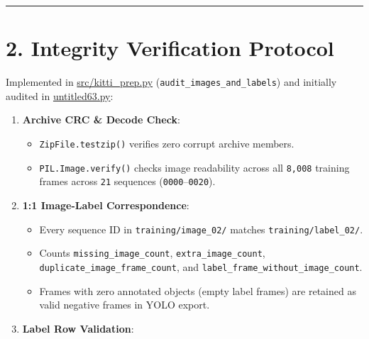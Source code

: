 \documentclass[10.5pt,a4paper]{article}
\begin{document}
\par\noindent\rule{\textwidth}{0.4pt}\par\medskip

\section{2. Integrity Verification Protocol}

Implemented in \href{https://github.com/Heisnotanimposter/Totalcare\_autonomous\_driving\_Yolov5/blob/main/src/kitti\_prep.py}{src/kitti\_prep.py} (\texttt{audit\_\allowbreak{}images\_\allowbreak{}and\_\allowbreak{}labels}) and initially audited in \href{https://github.com/Heisnotanimposter/Totalcare\_autonomous\_driving\_Yolov5/blob/main/untitled63.py}{untitled63.py}:


\begin{enumerate}[leftmargin=1.8em,itemsep=2pt]
\item \textbf{Archive CRC \& Decode Check}:
\begin{itemize}[leftmargin=1.5em,itemsep=2pt]
\item \texttt{ZipFile.\allowbreak{}testzip()} verifies zero corrupt archive members.
\item \texttt{PIL.\allowbreak{}Image.\allowbreak{}verify()} checks image readability across all \texttt{8,\allowbreak{}008} training frames across \texttt{21} sequences (\texttt{0000}--\texttt{0020}).
\end{itemize}
\item \textbf{1:1 Image-Label Correspondence}:
\begin{itemize}[leftmargin=1.5em,itemsep=2pt]
\item Every sequence ID in \texttt{training/\allowbreak{}image\_\allowbreak{}02/\allowbreak{}} matches \texttt{training/\allowbreak{}label\_\allowbreak{}02/\allowbreak{}}.
\item Counts \texttt{missing\_\allowbreak{}image\_\allowbreak{}count}, \texttt{extra\_\allowbreak{}image\_\allowbreak{}count}, \texttt{duplicate\_\allowbreak{}image\_\allowbreak{}frame\_\allowbreak{}count}, and \texttt{label\_\allowbreak{}frame\_\allowbreak{}without\_\allowbreak{}image\_\allowbreak{}count}.
\item Frames with zero annotated objects (empty label frames) are retained as valid negative frames in YOLO export.
\end{itemize}
\item \textbf{Label Row Validation}:
\begin{itemize}[leftmargin=1.5em,itemsep=2pt]

\end{itemize}
\end{enumerate}
\end{document}
